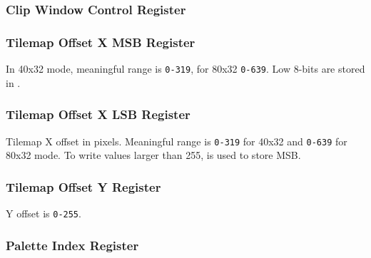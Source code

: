 \subsubsection{Clip Window Control Register }



\subsubsection{Tilemap Offset X MSB Register }

\begin{NextPort}
\end{NextPort}

In 40x32 mode, meaningful range is {\tt 0-319}, for 80x32 {\tt 0-639}. Low 8-bits are stored in .


\subsubsection{Tilemap Offset X LSB Register }

\begin{NextPort}
\end{NextPort}

Tilemap X offset in pixels. Meaningful range is {\tt 0-319} for 40x32 and {\tt 0-639} for 80x32 mode. To write values larger than 255,  is used to store MSB.


\subsubsection{Tilemap Offset Y Register }

\begin{NextPort}
\end{NextPort}

Y offset is {\tt 0-255}.


\subsubsection{Palette Index Register }
\vspace*{-2ex}
